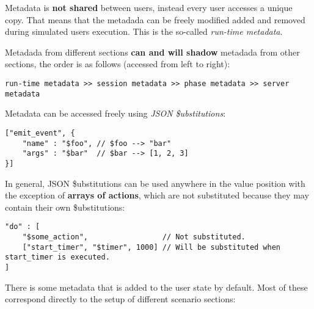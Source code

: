 \documentclass[a4paper]{article}
\begin{document}
\noindent
Metadata is \textbf{not shared} between users, instead every user accesses a unique copy. That means that the metadada can be freely modified added and removed during simulated users execution. This is the so-called \emph{run-time metadata}.

\noindent
Metadada from different sections \textbf{can and will shadow} metadada from other sections, the order is as follows (accessed from left to right):


\begin{verbatim}
run-time metadata >> session metadata >> phase metadata >> server metadata
\end{verbatim}




\noindent
Metadata can be accessed freely using \emph{JSON \$ubstitutions}:


\begin{verbatim}
["emit_event", {
    "name" : "$foo", // $foo --> "bar"
    "args" : "$bar"  // $bar --> [1, 2, 3]
}]
\end{verbatim}




\noindent
In general, JSON \$ubstitutions can be used anywhere in the value position with the exception of \textbf{arrays of actions}, which are not substituted because they may contain their own \$ubstitutions:


\begin{verbatim}
"do" : [
    "$some_action",                 // Not substituted.
    ["start_timer", "$timer", 1000] // Will be substituted when start_timer is executed.
]
\end{verbatim}




\noindent
There is some metadata that is added to the user state by default. Most of these correspond directly to the setup of different scenario sections:
\end{document}
